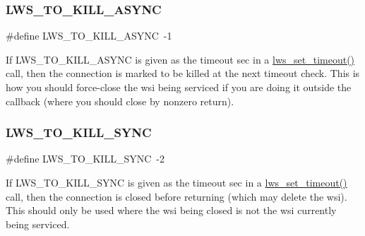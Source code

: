 \subsubsection{\texorpdfstring{L\+W\+S\+\_\+\+T\+O\+\_\+\+K\+I\+L\+L\+\_\+\+A\+S\+Y\+NC}{LWS\_TO\_KILL\_ASYNC}\hspace{0.1cm}{\footnotesize\ttfamily [6/6]}}
{\footnotesize\ttfamily \#define L\+W\+S\+\_\+\+T\+O\+\_\+\+K\+I\+L\+L\+\_\+\+A\+S\+Y\+NC~-\/1}

If L\+W\+S\+\_\+\+T\+O\+\_\+\+K\+I\+L\+L\+\_\+\+A\+S\+Y\+NC is given as the timeout sec in a \hyperlink{group__timeout_gaced9f9237f6172fed9f730a2af51345a}{lws\+\_\+set\+\_\+timeout()} call, then the connection is marked to be killed at the next timeout check. This is how you should force-\/close the wsi being serviced if you are doing it outside the callback (where you should close by nonzero return). \mbox{\label{group__timeout_ga3cef438d5bbd20a33afbec8e29a0b9a6}} 
\subsubsection{\texorpdfstring{L\+W\+S\+\_\+\+T\+O\+\_\+\+K\+I\+L\+L\+\_\+\+S\+Y\+NC}{LWS\_TO\_KILL\_SYNC}\hspace{0.1cm}{\footnotesize\ttfamily [1/6]}}
{\footnotesize\ttfamily \#define L\+W\+S\+\_\+\+T\+O\+\_\+\+K\+I\+L\+L\+\_\+\+S\+Y\+NC~-\/2}

If L\+W\+S\+\_\+\+T\+O\+\_\+\+K\+I\+L\+L\+\_\+\+S\+Y\+NC is given as the timeout sec in a \hyperlink{group__timeout_gaced9f9237f6172fed9f730a2af51345a}{lws\+\_\+set\+\_\+timeout()} call, then the connection is closed before returning (which may delete the wsi). This should only be used where the wsi being closed is not the wsi currently being serviced. \mbox{\label{group__timeout_ga3cef438d5bbd20a33afbec8e29a0b9a6}} 
